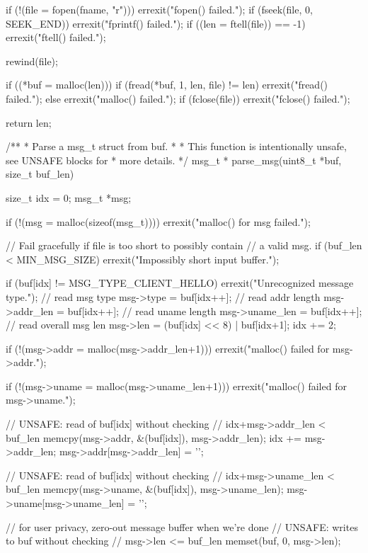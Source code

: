 \begin{appendices}
\begin{TCBlisting}[language={[ANSI]C},basicstyle=\scriptsize,caption={\mylstcaption}]
{    if (!(file = fopen(fname, "r"))) {
        errexit("fopen() failed.\n");
    }
    if (fseek(file, 0, SEEK_END)) {
        errexit("fprintf() failed.\n");
    }
    if ((len = ftell(file)) == -1) {
        errexit("ftell() failed.\n");
    }

    rewind(file);

    if ((*buf = malloc(len))) {
        if (fread(*buf, 1, len, file) != len) {
            errexit("fread() failed.\n");
        }
    } else {
        errexit("malloc() failed.\n");
    }
    if (fclose(file)) {
        errexit("fclose() failed.\n");
    }

    return len;
}

/**
 * Parse a msg_t struct from buf.
 *
 * This function is intentionally unsafe, see UNSAFE blocks for
 * more details.
 */
msg_t *
parse_msg(uint8_t *buf, size_t buf_len) {
    size_t idx = 0;
    msg_t *msg;

    if (!(msg = malloc(sizeof(msg_t)))) {
        errexit("malloc() for msg failed.\n");
    }

    // Fail gracefully if file is too short to possibly contain
    // a valid msg.
    if (buf_len < MIN_MSG_SIZE) {
        errexit("Impossibly short input buffer.\n");
    }

    if (buf[idx] != MSG_TYPE_CLIENT_HELLO) {
        errexit("Unrecognized message type.\n");
    }
    // read msg type
    msg->type = buf[idx++];
    // read addr length
    msg->addr_len = buf[idx++];
    // read uname length
    msg->uname_len = buf[idx++];
    // read overall msg len
    msg->len = (buf[idx] << 8) | buf[idx+1];
    idx += 2;

    if (!(msg->addr = malloc(msg->addr_len+1))) {
        errexit("malloc() failed for msg->addr.\n");
    }

    if (!(msg->uname = malloc(msg->uname_len+1))) {
        errexit("malloc() failed for msg->uname.\n");
    }

    // UNSAFE: read of buf[idx] without checking
    //         idx+msg->addr_len < buf_len
    memcpy(msg->addr, &(buf[idx]), msg->addr_len);
    idx += msg->addr_len;
    msg->addr[msg->addr_len] = '\0';

    // UNSAFE: read of buf[idx] without checking
    //         idx+msg->uname_len < buf_len
    memcpy(msg->uname, &(buf[idx]), msg->uname_len);
    msg->uname[msg->uname_len] = '\0';

    // for user privacy, zero-out message buffer when we're done
    // UNSAFE: writes to buf without checking
    //         msg->len <= buf_len
    memset(buf, 0, msg->len);

}
\end{TCBlisting}
\end{appendices}
